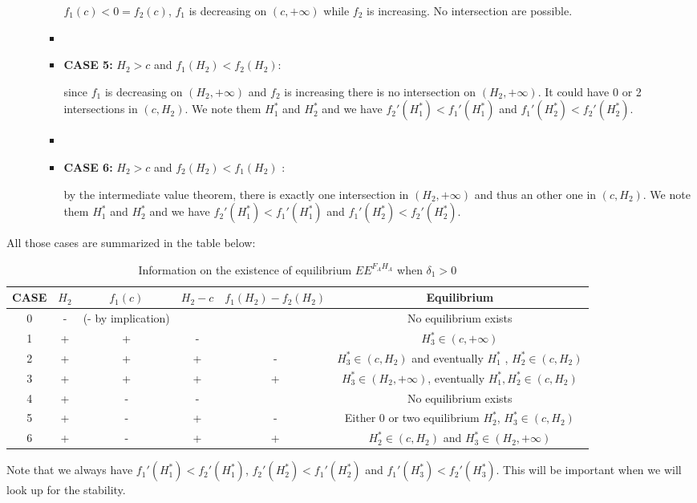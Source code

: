 \documentclass{article}
\begin{document}
\begin{appendices}
\begin{itemize}
\begin{itemize}
\begin{itemize}
$f_1(c) < 0 = f_2(c)$, $f_1$ is decreasing on $(c, +\infty)$ while $f_2$ is increasing. No intersection are possible.
\item[]
\item \textbf{CASE 5:}  $H_2 > c$ and $f_1(H_2) < f_2(H_2)$:

since $f_1$ is decreasing on $(H_2, +\infty)$ and $f_2$ is increasing there is no intersection on $(H_2, +\infty)$. It could have 0 or 2 intersections in $(c, H_2)$. We note them $H^*_1$ and $H^*_2$ and we have $f_2'(H^*_1) < f_1'(H^*_1)$ and $f_1'(H^*_2) < f_2'(H^*_2)$.
\item[]
\item \textbf{CASE 6:} $H_2 > c$ and $f_2(H_2) < f_1(H_2)$ :

by the intermediate value theorem, there is exactly one intersection in $(H_2, +\infty)$ and thus an other one in $(c, H_2)$. We note them $H^*_1$ and $H^*_2$ and we have $f_2'(H^*_1) < f_1'(H^*_1)$ and $f_1'(H^*_2) < f_2'(H^*_2)$.
\end{itemize}
\end{itemize}
\end{itemize}

All those cases are summarized in the table below:

\begin{table}[!ht]
\centering
\caption{Information on the existence of equilibrium $EE^{F_AH_A}$ when $\delta_1>0$}
\label{table : modelFAHA : existenceFAHA : d>0}
\begin{tabular}{c|c|c|c|c|c}
CASE & $H_2$ & $f_1(c)$ & $H_2 - c$ & $f_1(H_2) - f_2(H_2)$ & Equilibrium \\
\hline
0 & - & (- by implication) & & & No equilibrium exists \\
1 & + & + & - & & $H_3^* \in (c, +\infty)$\\
2 & + & + & + & - & $H_3^* \in (c, H_2)$ and eventually $H_1^*$ , $H_2^* \in (c, H_2)$  \\
3 & + & + & + & + & $ H_3^* \in (H_2, +\infty)$, eventually $H_1^*, H^*_2 \in (c, H_2)$ \\
4 & + & - & - & & No equilibrium exists \\
5 & + & - & + & - & Either 0 or two equilibrium $H_2^*$, $H_3^* \in (c, H_2)$ \\
6 & + &- & + & + & $H_2^* \in (c, H_2)$ and $H_3^* \in (H_2, + \infty)$
\end{tabular}
\end{table}
Note that we always have $f_1'(H^*_1) < f_2'(H^*_1)$, $f_2'(H^*_2) < f_1'(H^*_2)$ and $f_1'(H^*_3) < f_2'(H^*_3)$. This will be important when we will look up for the stability.


\end{appendices}
\end{document}
